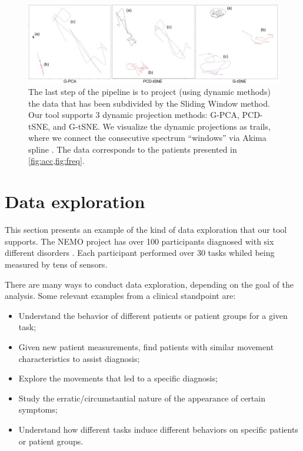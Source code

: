 \begin{figure}[ht]
\centering
\includegraphics[width=\linewidth]{figures/nemo/nemo1-projections.pdf}
\caption{The last step of the pipeline is to project (using dynamic methods) the data that has been subdivided by the Sliding Window method. Our tool supports 3 dynamic projection methods: G-PCA, PCD-tSNE, and G-tSNE. We visualize the dynamic projections as trails, where we connect the consecutive spectrum ``windows'' via Akima spline . The data corresponds to the patients presented in \cref{fig:acc,fig:freq}.}
\label{fig:nemo1-projections}
\end{figure}

\section{Data exploration}

This section presents an example of the kind of data exploration that our tool supports. The NEMO project has over 100 participants diagnosed with six different disorders . Each participant performed over 30 tasks whiled being measured by tens of sensors.

There are many ways to conduct data exploration, depending on the goal of the analysis. Some relevant examples from a clinical standpoint are:
\begin{itemize}
  \item Understand the behavior of different patients or patient groups for a given task; 
  \item Given new patient measurements, find patients with similar movement characteristics to assist diagnosis;
  \item Explore the movements that led to a specific diagnosis;
  \item Study the erratic/circumstantial nature of the appearance of certain symptoms;
  \item Understand how different tasks induce different behaviors on specific patients or patient groups. 
\end{itemize}

